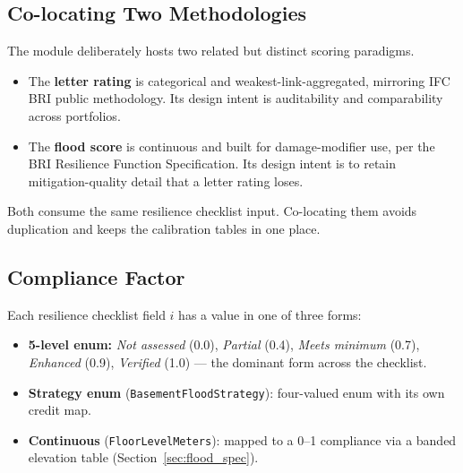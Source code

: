 \documentclass[11pt,a4paper]{article}
\begin{document}
\subsection{Co-locating Two Methodologies}
The module deliberately hosts two related but distinct scoring paradigms.

\begin{itemize}[nosep]
    \item The \textbf{letter rating} is categorical and weakest-link-aggregated,
          mirroring IFC BRI public methodology. Its design intent is auditability and
          comparability across portfolios.
    \item The \textbf{flood score} is continuous and built for damage-modifier use,
          per the BRI Resilience Function Specification. Its design intent is to
          retain mitigation-quality detail that a letter rating loses.
\end{itemize}

\noindent Both consume the same resilience checklist input. Co-locating them avoids
duplication and keeps the calibration tables in one place.

\mkmframework

\subsection{Compliance Factor}
Each resilience checklist field $i$ has a value in one of three forms:

\begin{itemize}[nosep]
    \item \textbf{5-level enum:} \emph{Not assessed} (0.0), \emph{Partial} (0.4),
          \emph{Meets minimum} (0.7), \emph{Enhanced} (0.9), \emph{Verified} (1.0)
          --- the dominant form across the checklist.
    \item \textbf{Strategy enum} (\texttt{BasementFloodStrategy}): four-valued enum
          with its own credit map.
    \item \textbf{Continuous} (\texttt{FloorLevelMeters}): mapped to a 0--1 compliance
          via a banded elevation table (Section~\ref{sec:flood_spec}).
\end{itemize}
\end{document}
